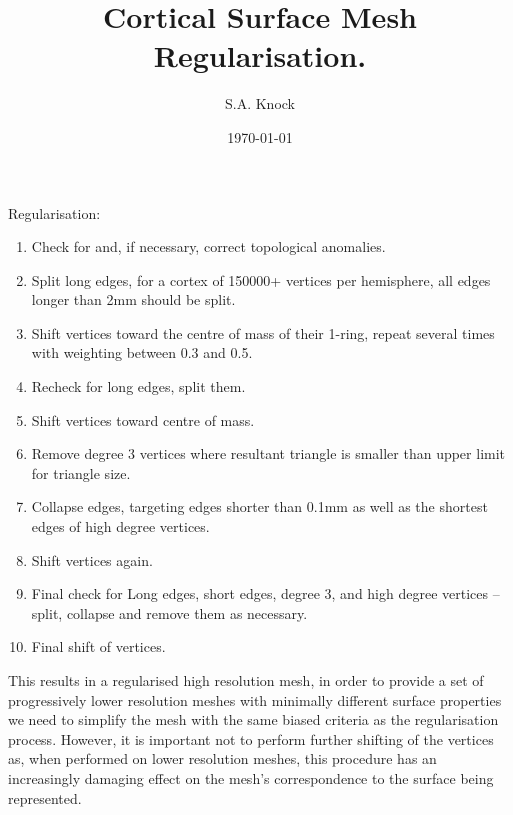 \documentclass[12pt,a4paper]{article}
\begin{document}
  \title{Cortical Surface Mesh Regularisation.}
  \author{S.A. Knock}  %
  \date{\today}
  \maketitle

   Regularisation:
   \begin{enumerate}
    \item Check for and, if necessary, correct topological anomalies.
    \item Split long edges, for a cortex of 150000+ vertices per 
          hemisphere, all edges longer than 2mm should be split.
    \item Shift vertices toward the centre of mass of their 1-ring, 
          repeat several times with weighting between 0.3 and 0.5.
    \item Recheck for long edges, split them.
    \item Shift vertices toward centre of mass.
    \item Remove degree 3 vertices where resultant triangle is smaller 
          than upper limit for triangle size.
    \item Collapse edges, targeting edges shorter than 0.1mm as well 
          as the shortest edges of high degree vertices.
    \item Shift vertices again.
    \item Final check for Long edges, short edges, degree 3, and 
          high degree vertices -- split, collapse and remove them 
          as necessary.
    \item Final shift of vertices. 
   \end{enumerate}
   This results in a regularised high resolution mesh, in order to 
   provide a set of progressively lower resolution meshes with 
   minimally different surface properties we need to simplify the 
   mesh with the same biased criteria as the regularisation process.
   However, it is important not to perform further shifting of the 
   vertices as, when performed on lower resolution meshes, this 
   procedure has an increasingly damaging effect on the mesh's 
   correspondence to the surface being represented.

  
\end{document}
